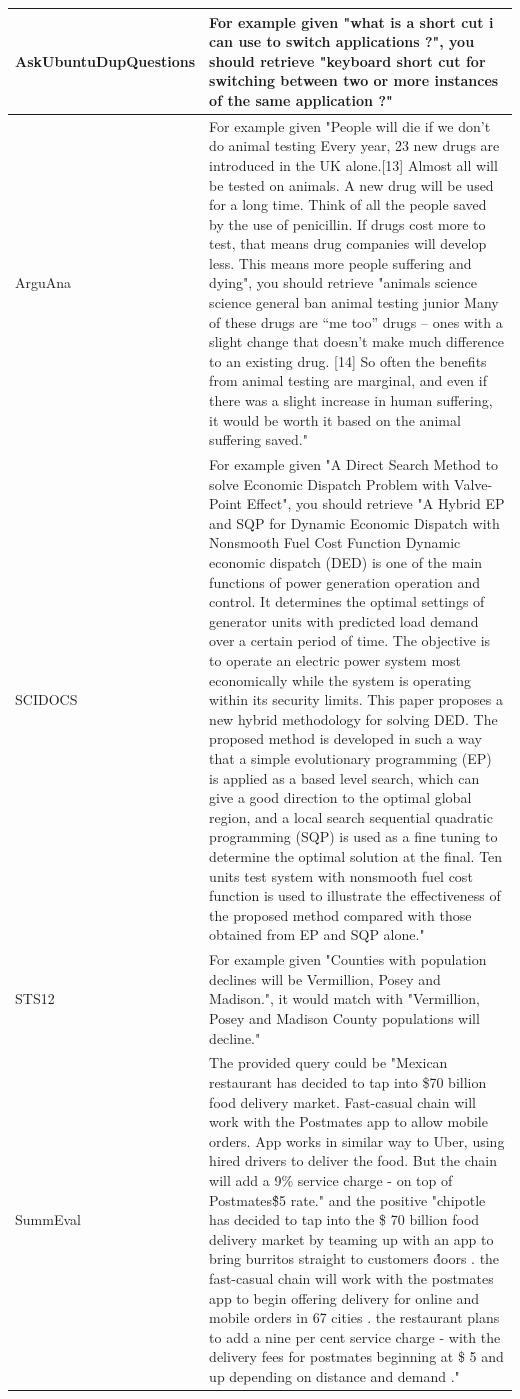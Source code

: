 \documentclass{article}
\begin{document}
\begin{longtable}{lp{9cm}}
\midrule
AskUbuntuDupQuestions & For example given "what is a short cut i can use to switch applications ?", you should retrieve "keyboard short cut for switching between two or more instances of the same application ?" \\
\midrule
ArguAna & For example given "People will die if we don’t do animal testing Every year, 23 new drugs are introduced in the UK alone.[13] Almost all will be tested on animals. A new drug will be used for a long time. Think of all the people saved by the use of penicillin. If drugs cost more to test, that means drug companies will develop less. This means more people suffering and dying", you should retrieve "animals science science general ban animal testing junior Many of these drugs are “me too” drugs – ones with a slight change that doesn’t make much difference to an existing drug. [14] So often the benefits from animal testing are marginal, and even if there was a slight increase in human suffering, it would be worth it based on the animal suffering saved."\\
SCIDOCS & For example given "A Direct Search Method to solve Economic Dispatch Problem with Valve-Point Effect", you should retrieve "A Hybrid EP and SQP for Dynamic Economic Dispatch with Nonsmooth Fuel Cost Function Dynamic economic dispatch (DED) is one of the main functions of power generation operation and control. It determines the optimal settings of generator units with predicted load demand over a certain period of time. The objective is to operate an electric power system most economically while the system is operating within its security limits. This paper proposes a new hybrid methodology for solving DED. The proposed method is developed in such a way that a simple evolutionary programming (EP) is applied as a based level search, which can give a good direction to the optimal global region, and a local search sequential quadratic programming (SQP) is used as a fine tuning to determine the optimal solution at the final. Ten units test system with nonsmooth fuel cost function is used to illustrate the effectiveness of the proposed method compared with those obtained from EP and SQP alone."\\
\midrule
STS12 & For example given "Counties with population declines will be Vermillion, Posey and Madison.", it would match with "Vermillion, Posey and Madison County populations will decline."\\
\midrule
SummEval & The provided query could be "Mexican restaurant has decided to tap into \$70 billion food delivery market. Fast-casual chain will work with the Postmates app to allow mobile orders. App works in similar way to Uber, using hired drivers to deliver the food. But the chain will add a 9\% service charge - on top of Postmates\' \$5 rate." and the positive "chipotle has decided to tap into the \$ 70 billion food delivery market by teaming up with an app to bring burritos straight to customers \' doors . the fast-casual chain will work with the postmates app to begin offering delivery for online and mobile orders in 67 cities . the restaurant plans to add a nine per cent service charge - with the delivery fees for postmates beginning at \$ 5 and up depending on distance and demand ."\\

\end{longtable}
\end{document}
